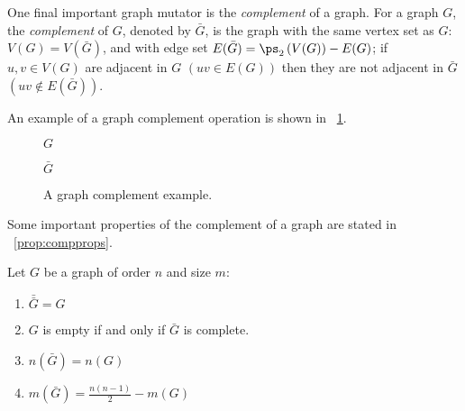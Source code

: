 One final important graph mutator is the \emph{complement} of a graph.  For a graph \(G\), the \emph{complement} of
\(G\), denoted by \(\bar{G}\), is the graph with the same vertex set as \(G\): \(V(G)=V(\bar{G})\), and with edge
set \(E(\bar{G})=\ps_2\left(V(G)\right)-E(G)\); if \(u,v\in V(G)\) are adjacent in \(G\) \(\left(uv\in
E(G)\right)\) then they are not adjacent in \(\bar{G}\) \(\left(uv\notin E(\bar{G})\right)\).

An example of a graph complement operation is shown in \figurename~\ref{fig:complement}.

\begin{figure}[H]
  \begin{minipage}{2.75in}
    \centering

    \(G\)
  \end{minipage}
  \begin{minipage}{2.75in}
    \centering

    \(\bar{G}\)
  \end{minipage}
  \caption{A graph complement example.}
  \label{fig:complement}
\end{figure}

Some important properties of the complement of a graph are stated in \propname~\ref{prop:compprops}.

\begin{proposition}
  \label{prop:compprops}
  Let \(G\) be a graph of order \(n\) and size \(m\):
  \begin{enumerate}
  \item \(\bar{\bar{G}}=G\)
  \item \(G\) is empty if and only if \(\bar{G}\) is complete.
  \item \(n(\bar{G})=n(G)\)
  \item \(m(\bar{G})=\frac{n(n-1)}{2}-m(G)\)
  \end{enumerate}
\end{proposition}

